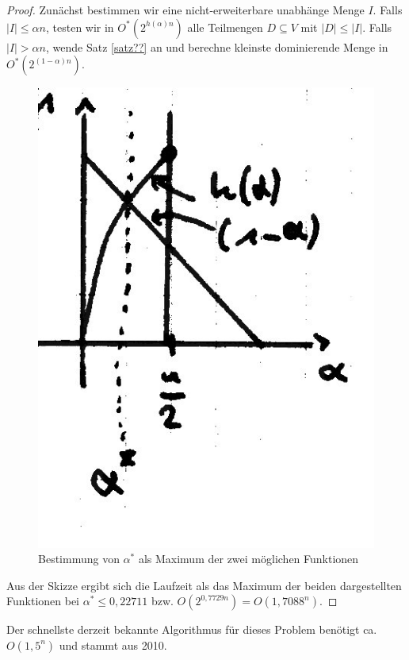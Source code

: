   \begin{proof}
    Zunächst bestimmen wir eine nicht-erweiterbare unabhänge Menge \(I\). 
    Falls \(|I| \leq \alpha n\), testen wir in \(O^*(2^{h(\alpha) n})\) alle Teilmengen \(D \subseteq V\) mit \(|D| \leq |I|\).
    Falls \(|I| > \alpha n\), wende Satz \ref{satz??} an und berechne kleinste dominierende Menge in \(O^*(2^{(1-\alpha)n})\). %
    
    \begin{figure}[h]
      \centering
      \includegraphics[width=.25\textwidth]{./Bilder/b02.jpg}
      \caption{Bestimmung von \(\alpha^*\) als Maximum der zwei möglichen Funktionen}
    \end{figure}
    
    Aus der Skizze ergibt sich die Laufzeit als das Maximum der beiden dargestellten Funktionen bei \(\alpha^* \leq 0,22711\) bzw. \(O(2^{0,7729n}) = O(1,7088^n)\).
  \end{proof}
  
  Der schnellste derzeit bekannte Algorithmus für dieses Problem benötigt ca. \(O(1,5^n)\) und stammt aus 2010.



